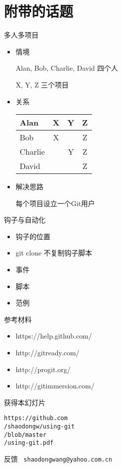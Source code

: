 \part{附带的话题}

\begin{frame}[<+->]{多人多项目}
    \begin{itemize}
        \item 情境

        Alan, Bob, Charlie, David 四个人

        X, Y, Z 三个项目
        \item 关系

\begin{center}
    \begin{tabular}{l|c c c}
        \hline
        Alan    &   X  &  Y  &  Z  \\ \hline
        Bob     &   X  &     &  Z  \\ \hline
        Charlie &      &  Y  &  Z  \\ \hline
        David   &      &     &  Z  \\ \hline
    \end{tabular}
\end{center}

        \item 解决思路

        每个项目设立一个Git用户
    \end{itemize}
\end{frame}


\begin{frame}[<+->][fragile]{钩子与自动化}
    \begin{itemize}
        \item 钩子的位置
        \item git clone 不复制钩子脚本
        \item 事件
        \item 脚本
        \item 范例
    \end{itemize}
\end{frame}

\begin{frame}[fragile]{参考材料}
    \begin{itemize}
        \item https://help.github.com/
        \item http://gitready.com/
        \item http://progit.org/
        \item http://gitimmersion.com/
    \end{itemize}
\end{frame}

\begin{frame}{获得本幻灯片}

{\Huge\tt https://github.com\\
/shaodongw/using-git\\
/blob/master\\
/using-git.pdf\\}
\end{frame}

\begin{frame}[<+->][fragile]{反馈}
{\huge\tt
shaodongwang@yahoo.com.cn
}
\end{frame}


